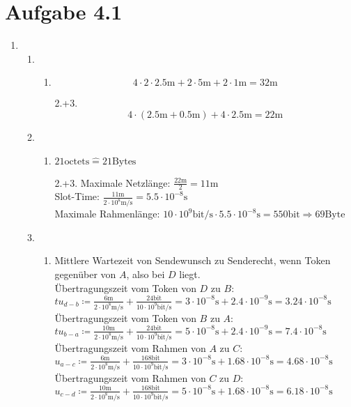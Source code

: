 \documentclass[12pt, a4paper]{article}
\begin{document}
\section*{Aufgabe 4.1}
\begin{enumerate}[label=\alph*)]
	\item	\begin{enumerate}[label=\roman*)]
				\item	\begin{enumerate}[label=\arabic*.]
							\item		$$4 \cdot 2 \cdot 2.5 \text{m} + 2 \cdot 5 \text{m} + 2 \cdot 1 \text{m} = 32 \text{m}$$
							\item[2.+3.]$$4 \cdot (2.5 \text{m} + 0.5 \text{m}) + 4 \cdot 2.5 \text{m} = 22 \text{m}$$
						\end{enumerate}
				\item	\begin{enumerate}[label=\arabic*.]
							\item		$21 \text{octets} \hat{=} 21 \text{Bytes}$
							\item[2.+3.]Maximale  Netzlänge: $\frac{22 \text{m}}{2} = 11 \text{m}$ \\
										Slot-Time: $\frac{11 \text{m}}{2 \cdot 10^8 \text{m/s}} = 5.5 \cdot 10^{-8} \text{s}$ \\
										Maximale Rahmenlänge: $10 \cdot 10^9 \text{bit/s} \cdot 5.5 \cdot 10^{-8} \text{s} = 550 \text{bit} \Rightarrow 69 \text{Byte}$
						\end{enumerate}
				\item	\begin{enumerate}[label=\arabic*.]
							\item		Mittlere Wartezeit von Sendewunsch zu Senderecht, wenn Token gegenüber von $A$, also bei $D$ liegt.\\
										Übertragungszeit vom Token von $D$ zu $B$: $tu_{d-b} \coloneqq \frac{6 \text{m}}{2 \cdot 10^8 \text{m/s}} + \frac{24 \text{bit}}{10 \cdot 10^9 \text{bit/s}} = 3 \cdot 10^{-8} \text{s} + 2.4 \cdot 10^{-9} \text{s} = 3.24 \cdot 10^{-8} \text{s}$\\
										Übertragungszeit vom Token von $B$ zu $A$: $tu_{b-a} \coloneqq \frac{10 \text{m}}{2 \cdot 10^8 \text{m/s}} + \frac{24 \text{bit}}{10 \cdot 10^9 \text{bit/s}} = 5 \cdot 10^{-8} \text{s} + 2.4 \cdot 10^{-9} \text{s} = 7.4 \cdot 10^{-8} \text{s}$\\
										
										Übertragungszeit vom Rahmen von $A$ zu $C$: $u_{a-c} \coloneqq \frac{6 \text{m}}{2 \cdot 10^8 \text{m/s}} + \frac{168 \text{bit}}{10 \cdot 10^9 \text{bit/s}} = 3 \cdot 10^{-8} \text{s} + 1.68 \cdot 10^{-8} \text{s} = 4.68 \cdot 10^{-8} \text{s}$\\
										Übertragungszeit vom Rahmen von $C$ zu $D$: $u_{c-d} \coloneqq \frac{10 \text{m}}{2 \cdot 10^8 \text{m/s}} + \frac{168 \text{bit}}{10 \cdot 10^9 \text{bit/s}} = 5 \cdot 10^{-8} \text{s} + 1.68 \cdot 10^{-8} \text{s} = 6.18 \cdot 10^{-8} \text{s}$\\
										

\end{enumerate}
\end{enumerate}
\end{enumerate}
\end{document}
